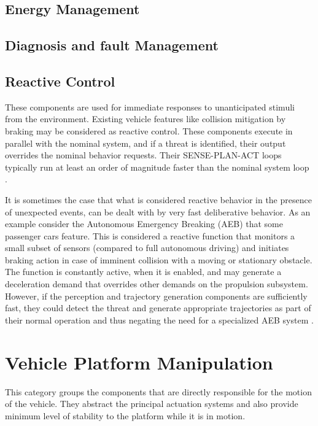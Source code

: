 \subsection{Energy Management}

\subsection{Diagnosis and fault Management}

\subsection{Reactive Control}
These components are used for immediate responses to unanticipated stimuli from the environment. Existing vehicle features like collision mitigation  by braking may be considered as reactive control. These components execute in parallel with the nominal system, and if a threat is identified, their output overrides the nominal behavior requests. Their SENSE-PLAN-ACT loops typically run at least an order of magnitude faster than the  nominal system loop \cite{Bahere}.

It is sometimes the case that what is considered reactive behavior in the presence of unexpected events, can be dealt with by very fast deliberative behavior. As an example consider the Autonomous Emergency Breaking (AEB) that some passenger cars feature. This is considered a reactive function that monitors a small subset of sensors
(compared to full autonomous driving) and initiates braking action in case of imminent collision with a moving or stationary obstacle. The function is constantly active, when it is enabled, and may generate a deceleration demand that overrides other demands on the propulsion subsystem. However, if the perception and trajectory generation components are sufficiently fast, they could detect the threat and generate appropriate trajectories as part of their normal operation and thus negating the need for a specialized AEB system \cite{Bahere}.  

\section{Vehicle Platform Manipulation}

This category groups the components that are directly responsible for the motion of the vehicle. They abstract the principal actuation systems and also
provide minimum level of stability to the platform while it is in motion. 

